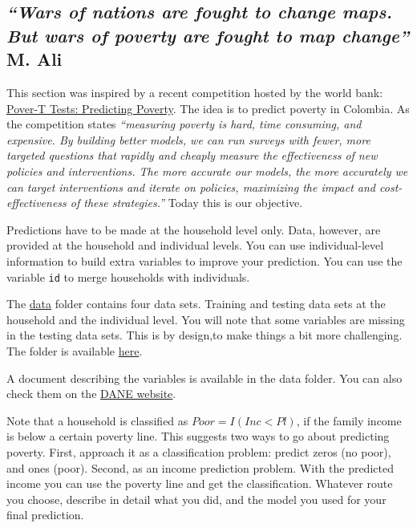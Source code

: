 \documentclass[12pt,onecolumn,A4]{article}
\begin{document}
\subsection{{\it ``Wars of nations are fought to change maps. But wars of poverty are fought to map change''} M. Ali}

This section was inspired by a recent competition hosted by the world bank: \href{https://www.drivendata.org/competitions/50/worldbank-poverty-prediction/page/97/}{Pover-T Tests: Predicting Poverty}. The idea is to predict poverty in Colombia. As the competition states {\it ``measuring poverty is hard, time consuming, and expensive. By building better models, we can run surveys with fewer, more targeted questions that rapidly and cheaply measure the effectiveness of new policies and interventions. The more accurate our models, the more accurately we can target interventions and iterate on policies, maximizing the impact and cost-effectiveness of these strategies.''} Today this is our objective.

Predictions have to be made at the household level only. Data, however, are provided at the household and individual levels. You can use individual-level information to build extra variables to improve your prediction. You can use the variable \texttt{id} to merge households with individuals. 


The \href{https://www.dropbox.com/s/5bam6ujbu9emjjk/data.zip?dl=0}{data} folder contains four data sets. Training and testing data sets at the household and the individual level. You will note that some variables are missing in the testing data sets. This is by design,to make things a bit more challenging. The folder is available \href{https://www.dropbox.com/s/5bam6ujbu9emjjk/data.zip?dl=0}{here}. 

A document describing the variables is available in the data folder. You can also check them on the  \href{http://microdatos.dane.gov.co/index.php/catalog/608/datafile/F1#page=F2&tab=data-dictionary}{DANE website}.


Note that a household is classified as $Poor=I(Inc<Pl)$, if the family income is below a certain poverty line. This suggests two ways to go about predicting poverty. First, approach it as a classification problem: predict zeros (no poor), and ones (poor). Second, as an income prediction problem. With the predicted income you can use the poverty line and get the classification. Whatever route you choose, describe in detail what you did, and the model you used for your final prediction. 
\end{document}
